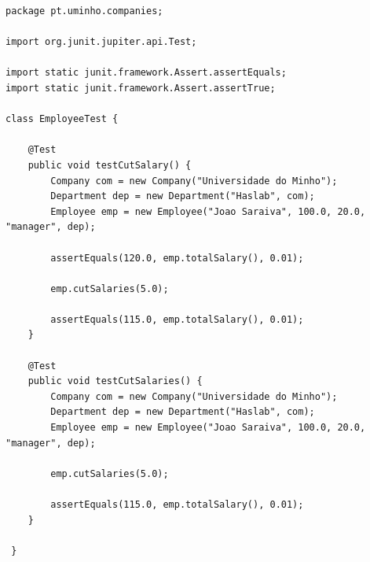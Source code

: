 \documentclass{article}
\begin{document}
\begin{lstlisting}[caption={Classe EmployeeTest},label={anoniTolambda},captionpos=t]
package pt.uminho.companies;

import org.junit.jupiter.api.Test;

import static junit.framework.Assert.assertEquals;
import static junit.framework.Assert.assertTrue;

class EmployeeTest {

	@Test
	public void testCutSalary() {
		Company com = new Company("Universidade do Minho");
		Department dep = new Department("Haslab", com);
		Employee emp = new Employee("Joao Saraiva", 100.0, 20.0, "manager", dep);

		assertEquals(120.0, emp.totalSalary(), 0.01);

		emp.cutSalaries(5.0);

		assertEquals(115.0, emp.totalSalary(), 0.01);
	}

	@Test
	public void testCutSalaries() {
		Company com = new Company("Universidade do Minho");
		Department dep = new Department("Haslab", com);
		Employee emp = new Employee("Joao Saraiva", 100.0, 20.0, "manager", dep);

		emp.cutSalaries(5.0);

		assertEquals(115.0, emp.totalSalary(), 0.01);
	}

 }

\end{lstlisting}

\newpage
\end{document}
